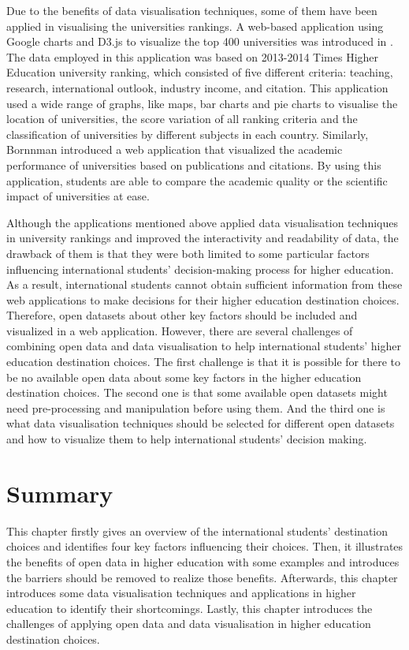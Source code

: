 Due to the benefits of data visualisation techniques, some of them have been applied in visualising the universities rankings. A web-based application using Google charts and D3.js to visualize the top 400 universities was introduced in \cite{aljehane2015visualizing}. The data employed in this application was based on 2013-2014 Times Higher Education university ranking, which consisted of five different criteria: teaching, research, international outlook, industry income, and citation. This application used a wide range of graphs, like maps, bar charts and pie charts to visualise the location of universities, the score variation of all ranking criteria and the classification of universities by different subjects in each country. Similarly, Bornnman \cite{bornmann2014ranking} introduced a web application that visualized the academic performance of universities based on publications and citations. By using this application, students are able to compare the academic quality or the scientific impact of universities at ease.

Although the applications mentioned above applied data visualisation techniques in university rankings and improved the interactivity and readability of data, the drawback of them is that they were both limited to some particular factors influencing international students’ decision-making process for higher education. As a result, international students cannot obtain sufficient information from these web applications to make decisions for their higher education destination choices. Therefore, open datasets about other key factors should be included and visualized in a web application. However, there are several challenges of combining open data and data visualisation to help international students’ higher education destination choices. The first challenge is that it is possible for there to be no available open data about some key factors in the higher education destination choices. The second one is that some available open datasets might need pre-processing and manipulation before using them. And the third one is what data visualisation techniques should be selected for different open datasets and how to visualize them to help international students’ decision making.



\section{Summary}



This chapter firstly gives an overview of the international students’ destination choices and identifies four key factors influencing their choices. Then, it illustrates the benefits of open data in higher education with some examples and introduces the barriers should be removed to realize those benefits. Afterwards, this chapter introduces some data visualisation techniques and applications in higher education to identify their shortcomings. Lastly, this chapter introduces the challenges of applying open data and data visualisation in higher education destination choices.
